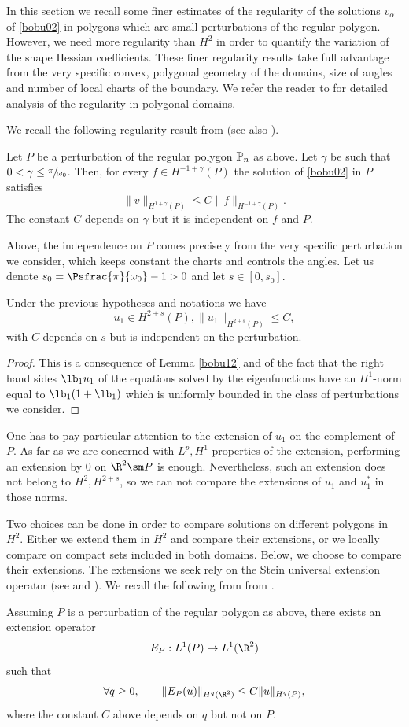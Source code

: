 In this section we recall some finer estimates of the regularity of the solutions $v_\alpha$ of \eqref{bobu02} in polygons which are small perturbations of the regular polygon. However, we need more regularity than $H^2$ in order to quantify the variation of the shape Hessian coefficients. These finer regularity results take full advantage from the very specific convex, polygonal geometry of the domains, size of angles and number of local charts of the boundary. We refer the reader to \cite{Da88} for detailed analysis of the regularity in polygonal domains.

We recall the following regularity result from \cite[Th.\,9.8]{BDLN92} (see also \cite{Da88}).
\begin{lemma}\label{bobu12}
Let $P$ be a perturbation of the regular polygon $\Bbb{P}_n$ as above. Let $\gamma$ be such that $0<\gamma\le \sfrac {\pi}{\omega_{0}}$. Then, for every $f \in H^{-1+ \gamma } (P)$ the solution of \eqref{bobu02} in $P$ satisfies
\[
\|v\|_{H^{1+\gamma}(P)} \le C \|f\|_{H^{-1+\gamma} (P)}.
\]
The constant $C$ depends on $\gamma$ but it is independent on $f$ and $P$.
\end{lemma}
Above, the independence on $P$ comes precisely from the very specific perturbation we consider, which keeps constant the charts and controls the angles. Let us denote $s_0 = \Psfrac {\pi}{\omega_{0}} - 1>0$ and let $s\in[0,s_0]$.
\begin{cor}
Under the previous hypotheses and notations we have
\[
u_1\in H^{2+s} (P), \|u_1\|_{H^{2+s} (P)} \le C,
\]
with $C$ depends on $s$ but is independent on the perturbation.
\end{cor}
\begin{proof}
This is a consequence of Lemma \ref{bobu12} and of the fact that the right hand sides $\lb_1 u_1$ of the equations solved by the eigenfunctions have an $H^1$-norm equal to $\lb_1 (1+ \lb_1)$ which is uniformly bounded in the class of perturbations we consider.
\end{proof}

One has to pay particular attention to the extension of $u_1$ on the complement of~$P$. As far as we are concerned with $L^p, H^1$ properties of the extension, performing an extension by $0$ on $\R^2\sm P$ is enough. Nevertheless, such an extension does not belong to $H^2, H^{2+s}$, so we can not compare the extensions of $u_1$ and $u_1^*$ in those norms.

Two choices can be done in order to compare solutions on different polygons in $H^2$. Either we extend them in $H^2$ and compare their extensions, or we locally compare on compact sets included in both domains. Below, we choose to compare their extensions. The extensions we seek rely on the Stein universal extension operator (see \cite{St70} and \cite{LaVi19,HLZ12}). We recall the following from from \cite{ St70}.
\begin{propo} \label{bobu13}
Assuming $P$ is a perturbation of the regular polygon as above, there exists an extension operator
\[
E_P: L^1(P) \to L^1(\R^2)
\]
such that
\[
\forall q \ge 0, \qquad \| E_P(u) \|_{H^q (\R^2)} \le C\| u\|_{H^q(P)},
\]
where the constant $C$ above depends on $q$ but not on $P$.
\end{propo}


